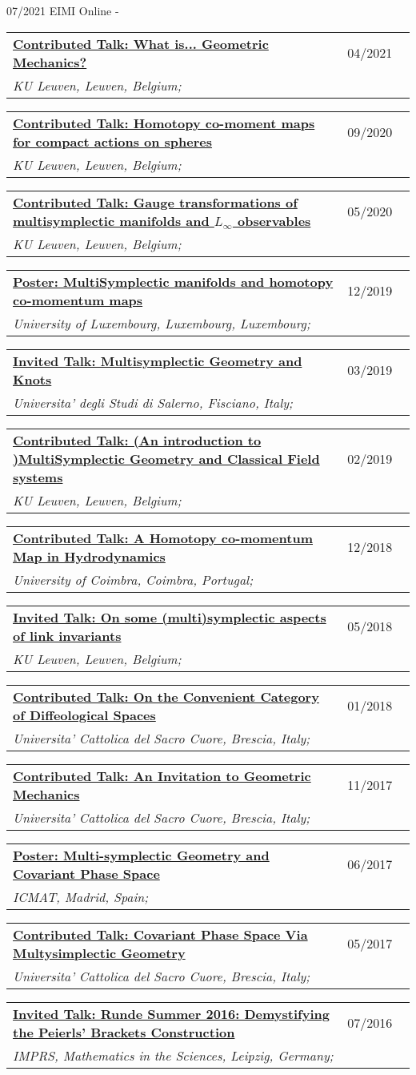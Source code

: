 \documentclass[a4paper]{article}
\newcommand{\longvoice}[8]{
	\begin{tabular}{p{0.83\linewidth} p{0.17\linewidth} }
		\textbf{\href{#3}{#2: #1}} & #4 
		\\ 
		\textit{#5, #6, #7;} & {\small\emph{#8}}
	\end{tabular}
	\vspace{.5em}
}
\begin{document}
		{07/2021}
		{EIMI}
		{Online}
		{-}
		{}
	\longvoice{What is... Geometric Mechanics?}
		{Contributed Talk}
		{https://wis.kuleuven.be/agenda/PhdColloquia/ay20-21/copy4_of_PhD-coll-Molag}
		{04/2021}
		{KU Leuven}
		{Leuven}
		{Belgium}
		{}
	\longvoice{Homotopy co-moment maps for compact actions on spheres}
		{Contributed Talk}
		{https://www.researchgate.net/publication/344220375_Homotopy_co-moment_maps_for_compact_actions_on_spheres}
		{09/2020}
		{KU Leuven}
		{Leuven}
		{Belgium}
		{}
	\longvoice{Gauge transformations of multisymplectic manifolds and $L_\infty$ observables}
		{Contributed Talk}
		{https://www.researchgate.net/publication/344044689_Gauge_transformations_of_multisymplectic_manifolds_and_L_infinity_observables}
		{05/2020}
		{KU Leuven}
		{Leuven}
		{Belgium}
		{}
	\longvoice{MultiSymplectic manifolds and homotopy co-momentum maps}
		{Poster}
		{https://www.researchgate.net/publication/338019063_Multisymplectic_manifolds_and_Homotopy_co-momentum_maps}
		{12/2019}
		{University of Luxembourg}
		{Luxembourg}
		{Luxembourg}
		{}
	\longvoice{Multisymplectic Geometry and Knots}
		{Invited Talk}
		{https://www.researchgate.net/publication/331939491_Multisymplectic_aspects_of_link_invariants}
		{03/2019}
		{Universita' degli Studi di Salerno}
		{Fisciano}
		{Italy}
		{}
	\longvoice{(An introduction to )MultiSymplectic Geometry and Classical Field systems}
		{Contributed Talk}
		{https://www.dropbox.com/s/q68uv6hbbej8d09/1902-Talk-MultisymplecticFields.pdf?dl=0}
		{02/2019}
		{KU Leuven}
		{Leuven}
		{Belgium}
		{}
	\longvoice{A Homotopy co-momentum Map in Hydrodynamics}
		{Contributed Talk}
		{https://www.researchgate.net/publication/329572409_Homotopy_co-momentum_Map_in_Hydrodynamics}
		{12/2018}
		{University of Coimbra}
		{Coimbra}
		{Portugal}
		{}
	\longvoice{On some (multi)symplectic aspects of link invariants}
		{Invited Talk}
		{https://web.archive.org/web/20180424133109/https://wis.kuleuven.be/agenda/sem-geometry/academic-year-2017-2018/seminar_differential_geometry_Miti}
		{05/2018}
		{KU Leuven}
		{Leuven}
		{Belgium}
		{}
	\longvoice{On the Convenient Category of Diffeological Spaces}
		{Contributed Talk}
		{https://www.dropbox.com/s/thm6unntpduynh3/1801-Talk-ConvenientDiffeological.pdf?dl=0}
		{01/2018}
		{Universita' Cattolica del Sacro Cuore}
		{Brescia}
		{Italy}
		{}
	\longvoice{An Invitation to Geometric Mechanics}
		{Contributed Talk}
		{https://www.dropbox.com/s/k066hn2ubovhaop/1711-talk-invitationGeoMec.pdf?dl=0}
		{11/2017}
		{Universita' Cattolica del Sacro Cuore}
		{Brescia}
		{Italy}
		{}
	\longvoice{Multi-symplectic Geometry and Covariant Phase Space}
		{Poster}
		{https://www.researchgate.net/publication/319301416_Multi-symplectic_Geometry_and_Covariant_Phase_Space}
		{06/2017}
		{ICMAT}
		{Madrid}
		{Spain}
		{}
	\longvoice{Covariant Phase Space Via Multysimplectic Geometry}
		{Contributed Talk}
		{https://www.researchgate.net/publication/319301194_Notes_on_Covariant_Phase_Space_via_MultiSymplectic_Geometry}
		{05/2017}
		{Universita' Cattolica del Sacro Cuore}
		{Brescia}
		{Italy}
		{}
	\longvoice{Runde Summer 2016: Demystifying the Peierls' Brackets Construction}
		{Invited Talk}
		{https://www.dropbox.com/s/slk28t877e2nxtq/1607-Liepzig-RundeSummer.PDF?dl=0}
		{07/2016}
		{IMPRS, Mathematics in the Sciences}
		{Leipzig}
		{Germany}
		{}
\end{document}
